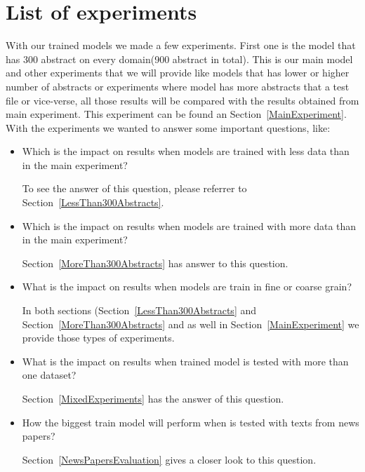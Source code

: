 \documentclass[thesis=M,english]{FITthesis}[2018/05/30]
\begin{document}
\section{List of experiments}
	With our trained models we made a few experiments. First one is the model that has 300 abstract on every domain(900 abstract in total). This is our main model and other experiments that we will provide like models that has lower or higher number of abstracts or experiments where model has more abstracts that a test file or vice-verse, all those results will be compared with the results obtained from main experiment. This experiment can be found an Section~\ref{MainExperiment}.
	With the experiments we wanted to answer some important questions, like:
\begin{itemize}
	\item Which is the impact on results when models are trained with less data than in the main experiment?
	
	To see the answer of this question, please referrer to Section~\ref{LessThan300Abstracts}.
	
	\item Which is the impact on results when models are trained with more data than in the main experiment? 
	
	Section~\ref{MoreThan300Abstracts} has answer to this question.
	
	\item What is the impact on results when models are train in fine or coarse grain? 
	
	In both sections (Section~\ref{LessThan300Abstracts} and Section~\ref{MoreThan300Abstracts} and as well in Section~\ref{MainExperiment} we provide those types of experiments.
	
	\item What is the impact on results when trained model is tested with more than one dataset? 
	
	Section~\ref{MixedExperiments} has the answer of this question.
	
	\item How the biggest train model will perform when is tested with texts from news papers?
	
	Section~\ref{NewsPapersEvaluation} gives a closer look to this question.

\end{itemize}



%
\end{document}
